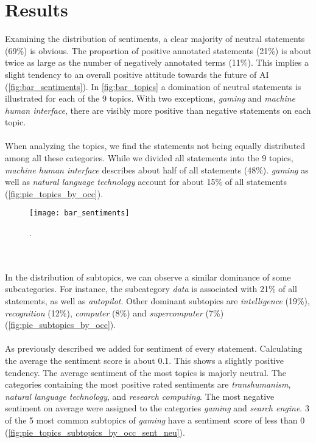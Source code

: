 \section{Results}
\label{results}
Examining the distribution of sentiments, a clear majority of neutral statements  (69\%) is obvious. The proportion of positive annotated statements (21\%) is about twice as large as the number of negatively annotated terms (11\%). This implies a slight tendency to an overall positive attitude towards the future of AI (\autoref{fig:bar_sentiments}). In \autoref{fig:bar_topics} a domination of neutral statements is illustrated for each of the 9 topics. With two exceptions, \emph{gaming} and \emph{machine human interface}, there are visibly more positive than negative statements on each topic.
\\
\\
When analyzing the topics, we find the statements not being equally distributed among all these categories.
While we divided all statements into the 9 topics, \emph{machine human interface} describes about half of all statements (48\%).
\emph{gaming} as well as \emph{natural language technology} account for about 15\% of all statements (\autoref{fig:pie_topics_by_occ}).
\begin{figure}[t]
    \centering
    \texttt{[image: bar\_sentiments]}
    \caption{
        .
    }
    \label{fig:bar_sentiments}
\end{figure}
\\
\\
In the distribution of subtopics, we can observe a similar dominance of some subcategories. For instance, the subcategory \emph{data} is associated with 21\% of all statements, as well as \emph{autopilot}. Other dominant subtopics are \emph{intelligence} (19\%), \emph{recognition} (12\%), \emph{computer} (8\%) and \emph{supercomputer} (7\%) (\autoref{fig:pie_subtopics_by_occ}).
\\
\\
As previously described we added for sentiment of every statement.
Calculating the average the sentiment score is about 0.1.
This shows a slightly positive tendency.
The average sentiment of the most topics is majorly neutral.
The categories containing the most positive rated sentiments are \emph{transhumanism}, \emph{natural language technology}, and \emph{research computing}. The most negative sentiment on average were assigned to the categories \emph{gaming} and \emph{search engine}. 3 of the 5 most common subtopics of \emph{gaming} have a sentiment score of less than 0 (\autoref{fig:pie_topics_subtopics_by_occ_sent_neu}).
